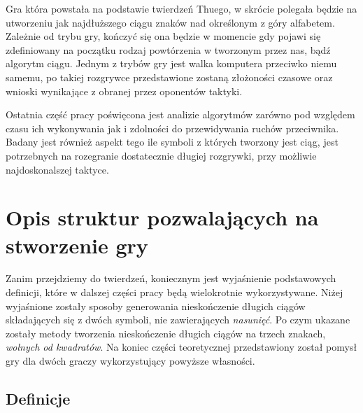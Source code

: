 \documentclass[document]{xmgr}
\begin{document}
Gra która powstała na podstawie twierdzeń Thuego, w skrócie polegała będzie na utworzeniu jak najdłuższego ciągu znaków nad określonym z góry alfabetem. Zależnie od trybu gry, kończyć się ona będzie w momencie gdy pojawi się zdefiniowany na początku rodzaj powtórzenia w tworzonym przez nas, bądź algorytm ciągu. Jednym z trybów gry jest walka komputera przeciwko niemu samemu, po takiej rozgrywce przedstawione zostaną złożoności czasowe oraz wnioski wynikające z obranej przez oponentów taktyki. 

Ostatnia część pracy poświęcona jest analizie algorytmów zarówno pod względem czasu ich wykonywania jak i zdolności do przewidywania ruchów przeciwnika. Badany jest również aspekt tego ile symboli z których tworzony jest ciąg, jest potrzebnych na rozegranie dostatecznie długiej rozgrywki, przy możliwie najdoskonalszej taktyce.

\chapter{Opis struktur pozwalających na stworzenie gry}
Zanim przejdziemy do twierdzeń, koniecznym jest wyjaśnienie podstawowych definicji, które w dalszej części pracy będą wielokrotnie wykorzystywane. Niżej wyjaśnione zostały sposoby generowania nieskończenie długich ciągów składających się z dwóch symboli, nie zawierających \emph{nasunięć}. Po czym ukazane zostały metody tworzenia nieskończenie długich ciągów na trzech znakach, \emph{wolnych od kwadratów}. Na koniec części teoretycznej przedstawiony został pomysł gry dla dwóch graczy wykorzystujący powyższe własności.


\section{Definicje}
\end{document}
